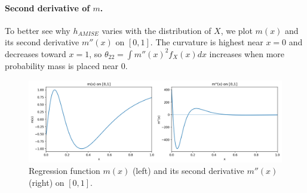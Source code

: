 \documentclass[11pt]{article}
\begin{document}
\paragraph{Second derivative of \(m\).}
To better see why \(h_{AMISE}\) varies with the distribution of \(X\), we plot \(m(x)\) and its second derivative \(m''(x)\) on \([0,1]\).
The curvature is highest near \(x=0\) and decreases toward \(x=1\), so \(\theta_{22}=\int m''(x)^2 f_X(x)dx\) increases when more probability mass is placed near \(0\).

\begin{figure}[h]
\centering
\includegraphics[width=.9\linewidth]{output/m_and_mpp.png}
\caption{Regression function \(m(x)\) (left) and its second derivative \(m''(x)\) (right) on \([0,1]\).}
\label{fig:m_mpp}
\end{figure}
\FloatBarrier
\end{document}
